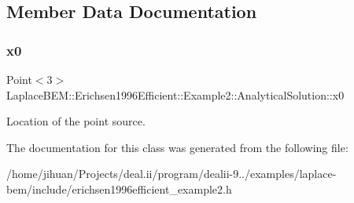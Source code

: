 \subsection{Member Data Documentation}
\mbox{\label{classLaplaceBEM_1_1Erichsen1996Efficient_1_1Example2_1_1AnalyticalSolution_abc18babc7510cbb8228ae4382392bac8}} 
\subsubsection{\texorpdfstring{x0}{x0}}
{\footnotesize\ttfamily Point$<$3$>$ Laplace\+B\+E\+M\+::\+Erichsen1996\+Efficient\+::\+Example2\+::\+Analytical\+Solution\+::x0\hspace{0.3cm}{\ttfamily [private]}}

Location of the point source. 

The documentation for this class was generated from the following file\+:\begin{DoxyCompactItemize}
\item 
/home/jihuan/\+Projects/deal.\+ii/program/dealii-\/9../examples/laplace-\/bem/include/erichsen1996efficient\+\_\+example2.\+h\end{DoxyCompactItemize}
